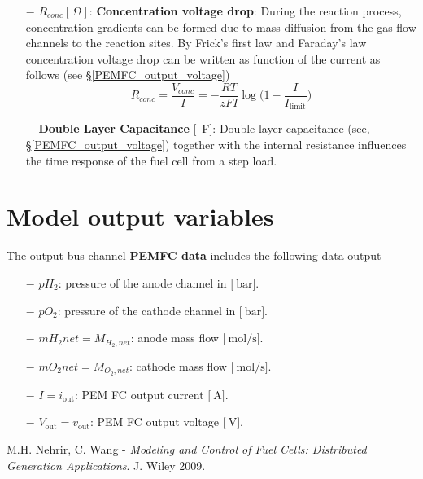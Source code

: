 \documentclass[11pt,a4paper]{article}
\numberwithin{equation}{section}
\theoremstyle{it}
\theoremstyle{definition}
\begin{document}
\begin{itemize}
	\item[$-$] $R_{conc}[\SI{}{\ohm}]$: \textbf{Concentration voltage drop}: During the reaction process, concentration  gradients can be formed due to mass diffusion from the gas flow channels to the reaction sites. By Frick's first law and Faraday's law concentration voltage drop can be written as function of the current as follows (see §\ref{PEMFC_output_voltage})
	\begin{equation}
		R_{conc}=\frac{V_{conc}}{I}=-\frac{RT}{zFI}\log\Big(1-\frac{I}{I_{\text{limit}}}\Big)
	\end{equation} 
	\item[$-$] \textbf{Double Layer Capacitance} [\SI{}{\farad}]: Double layer capacitance (see, §\ref{PEMFC_output_voltage}) together with the internal resistance influences the time response of the fuel cell from a step load.
\end{itemize}

\section{Model output variables}
The output bus channel \textbf{PEMFC data} includes the following data output
\begin{itemize}
	\item[$-$] $pH_2$: pressure of the anode channel in $\Big[\SI{}{\bar}\Big]$.
	\item[$-$] $pO_2$: pressure of the cathode channel in $\Big[\SI{}{\bar}\Big]$.
	\item[$-$] $mH_2net=M_{H_2,net}$: anode mass flow $\Big[\SI{}{\mol\per\second}\Big]$.
	\item[$-$] $mO_2net=M_{O_2,net}$: cathode mass flow $\Big[\SI{}{\mol\per\second}\Big]$.
	\item[$-$] $I = i_\text{out}$: PEM FC output current $\Big[\SI{}{\ampere}\Big]$.
	\item[$-$] $V_\text{out} = v_\text{out}$: PEM FC output voltage $\Big[\SI{}{\volt}\Big]$.
\end{itemize}

\begin{thebibliography}{99}
	 M.H. Nehrir, C. Wang - \textit{Modeling and Control of Fuel Cells: Distributed Generation Applications}. J. Wiley 2009.
	
\end{thebibliography}
\end{document}
